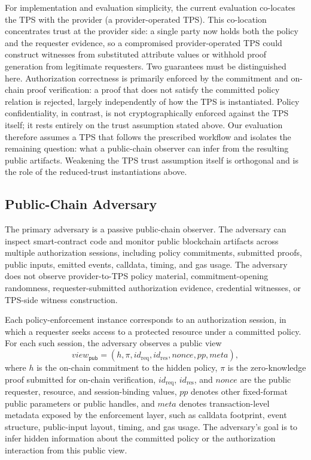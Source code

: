 For implementation and evaluation simplicity, the current evaluation co-locates the TPS with the provider (a provider-operated TPS).
This co-location concentrates trust at the provider side: a single party now holds both the policy and the requester evidence, so a compromised provider-operated TPS could construct witnesses from substituted attribute values or withhold proof generation from legitimate requesters.
Two guarantees must be distinguished here.
Authorization correctness is primarily enforced by the commitment and on-chain proof verification: a proof that does not satisfy the committed policy relation is rejected, largely independently of how the TPS is instantiated.
Policy confidentiality, in contrast, is not cryptographically enforced against the TPS itself; it rests entirely on the trust assumption stated above.
Our evaluation therefore assumes a TPS that follows the prescribed workflow and isolates the remaining question: what a public-chain observer can infer from the resulting public artifacts.
Weakening the TPS trust assumption itself is orthogonal and is the role of the reduced-trust instantiations above.

\subsection{Public-Chain Adversary}

The primary adversary is a passive public-chain observer.
The adversary can inspect smart-contract code and monitor public blockchain artifacts across
multiple authorization sessions, including policy commitments, submitted
proofs, public inputs, emitted events, calldata, timing, and gas usage.
The adversary does not observe provider-to-TPS policy material, commitment-opening
randomness, requester-submitted authorization evidence, credential witnesses,
or TPS-side witness construction.

Each policy-enforcement instance corresponds to an authorization session, in
which a requester seeks access to a protected resource under a committed policy.
For each such session, the adversary observes a public view
\begin{equation}
	\mathit{view}_{\mathsf{pub}}= (h, \pi, \mathit{id}_{\mathrm{req}}, \mathit{id}_{\mathrm{res}}, \mathit{nonce}, \mathit{pp}, \mathit{meta}),
\end{equation}
where $h$ is the on-chain commitment to the hidden policy, $\pi$ is the zero-knowledge
proof submitted for on-chain verification, $\mathit{id}_{\mathrm{req}}$, $\mathit{id}_{\mathrm{res}}$, and $\mathit{nonce}$ are the
public requester, resource, and session-binding values, $\mathit{pp}$ denotes other fixed-format
public parameters or public handles, and $\mathit{meta}$ denotes transaction-level metadata
exposed by the enforcement layer, such as calldata footprint, event structure,
public-input layout, timing, and gas usage. The adversary's goal is to infer hidden
information about the committed policy or the authorization interaction from
this public view.

